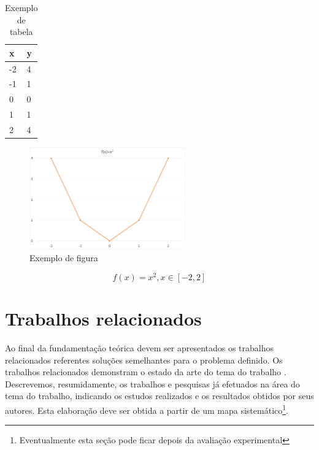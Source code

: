 \documentclass[12pt]{article}
\begin{document}
	\begin{table}[!ht]
		\centering
		\caption{Exemplo de tabela}
		\begin{tabular}{L{1.5cm} R{1.5cm}}
			\toprule
			\textbf{x}  & \textbf{y} \\
			  & 4 \\
			-1  & 1 \\
			0  & 0 \\
			1  & 1 \\
			2  & 4 \\
			\bottomrule
		\end{tabular}
		\label{tab_exemplo}
	\end{table}
	
\begin{figure}[!ht]
 \centering
 \includegraphics[width=0.6\textwidth]{figures/figura.png}
 \caption{Exemplo de figura}
 \label{fig_exemplo}
\end{figure}	

\begin{equation}
\label{eq_exemplo}
 f(x) = x^2, x \in [-2,2]
\end{equation}


	
	
	\section{Trabalhos relacionados}
	\label{sec_trab_relacionados}
	
	Ao final da fundamentação teórica devem ser apresentados os trabalhos relacionados referentes soluções semelhantes para o problema definido. Os trabalhos relacionados demonstram o estado da arte do tema do trabalho \citep{wazlawick_metodologia_2017}. Descrevemos, resumidamente, os trabalhos e pesquisas já efetuados na área do tema do trabalho, indicando os estudos realizados e os resultados obtidos por seus autores. Esta elaboração deve ser obtida a partir de um mapa sistemático\footnote{Eventualmente esta seção pode ficar depois da avaliação experimental}. 
	
\end{document}
